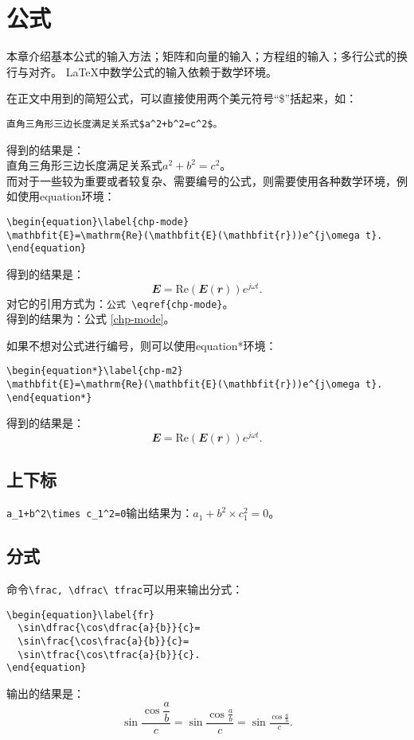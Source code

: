 \chapter{公式}\label{chap:equ}

本章介绍基本公式的输入方法；矩阵和向量的输入；方程组的输入；多行公式的换行与对齐。
\LaTeX 中数学公式的输入依赖于数学环境。

在正文中用到的简短公式，可以直接使用两个美元符号“\$”括起来，如：
\begin{verbatim}
直角三角形三边长度满足关系式$a^2+b^2=c^2$。
\end{verbatim}
得到的结果是：\\
直角三角形三边长度满足关系式$a^2+b^2=c^2$。\\

而对于一些较为重要或者较复杂、需要编号的公式，则需要使用各种数学环境，例如使用equation环境：
\begin{verbatim}
\begin{equation}\label{chp-mode}
\mathbfit{E}=\mathrm{Re}(\mathbfit{E}(\mathbfit{r}))e^{j\omega t}.
\end{equation}
\end{verbatim}
得到的结果是：
\begin{equation}\label{chp-mode}
\mathbfit{E}=\mathrm{Re}(\mathbfit{E}(\mathbfit{r}))e^{j\omega t}.
\end{equation}
对它的引用方式为：\verb|公式 \eqref{chp-mode}|。\\
得到的结果为：公式 \eqref{chp-mode}。

如果不想对公式进行编号，则可以使用equation*环境：
\begin{verbatim}
\begin{equation*}\label{chp-m2}
\mathbfit{E}=\mathrm{Re}(\mathbfit{E}(\mathbfit{r}))e^{j\omega t}.
\end{equation*}
\end{verbatim}
得到的结果是：
\begin{equation*}\label{chp-m2}
\mathbfit{E}=\mathrm{Re}(\mathbfit{E}(\mathbfit{r}))e^{j\omega t}.
\end{equation*}

\section{上下标}\label{section4-1}
\verb|a_1+b^2\times c_1^2=0|输出结果为：$a_1+b^2\times c_1^2=0$。

\section{分式}\label{section4-2}
命令\verb|\frac, \dfrac\ tfrac|可以用来输出分式：
\begin{verbatim}
\begin{equation}\label{fr}
  \sin\dfrac{\cos\dfrac{a}{b}}{c}=
  \sin\frac{\cos\frac{a}{b}}{c}=
  \sin\tfrac{\cos\tfrac{a}{b}}{c}.
\end{equation}
\end{verbatim}
输出的结果是：
\begin{equation}\label{fr}
\sin\dfrac{\cos\dfrac{a}{b}}{c}=
\sin\frac{\cos\frac{a}{b}}{c}=
\sin\tfrac{\cos\tfrac{a}{b}}{c}.
\end{equation}

